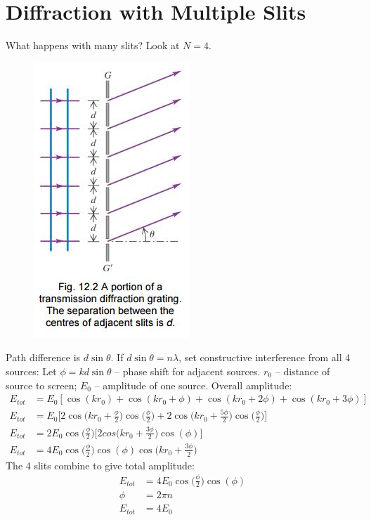 \documentclass[a4paper, 11pt, normalem]{report}
\begin{document}
\section{Diffraction with Multiple Slits}
What happens with many slits?
Look at $N = 4$.
\begin{figure}[H]
    \centering
    \includegraphics[scale=0.8]{Grating.jpg}
\end{figure}
Path difference is $d\sin{\theta}$.
If $d\sin{\theta} = n\lambda$, set constructive interference from all 4 sources:
Let $\phi = kd\sin{\theta}$ -- phase shift for adjacent sources.
$r_{0}$ -- distance of source to screen; $E_{0}$ -- amplitude of one source.
Overall amplitude:
\begin{align}
    E_{tot} &= E_{0}[\cos{(kr_{0})} + \cos{(kr_{0} + \phi)} + \cos{(kr_{0} + 2\phi)} + \cos{(kr_{0} + 3\phi)}] \\
    E_{tot} &= E_{0}\bigg[2\cos{\big(kr_{0} + \tfrac{\phi}{2}\big)}\cos{\big(\tfrac{\phi}{2}\big)} + 2\cos{\big(kr_{0} + \tfrac{5\phi}{2}\big)}\cos{\big(\tfrac{\phi}{2}\big)}\bigg] \\
    E_{tot} &= 2E_{0}\cos{\big(\tfrac{\phi}{2}\big)}\bigg[2cos{\big(kr_{0} + \tfrac{3\phi}{2}\big)}\cos{(\phi)}\bigg] \\
    E_{tot} &= 4E_{0}\cos{\big(\tfrac{\phi}{2}\big)}\cos{(\phi)}\cos{\big(kr_{0} + \tfrac{3\phi}{2}\big)}
\end{align}
The 4 slits combine to give total amplitude:
\begin{align}
    E_{tot} &= 4E_{0}\cos{\big(\tfrac{\phi}{2}\big)}\cos{(\phi)} \\
    \phi &= 2\pi n \\
    E_{tot} &= 4E_{0}
\end{align}
\end{document}

